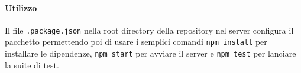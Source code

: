 				\paragraph{Utilizzo}
				Il file \texttt{.package.json} nella root directory della repository nel server configura il pacchetto permettendo poi di usare i semplici comandi \texttt{npm install} per installare le dipendenze, \texttt{npm start} per avviare il server e \texttt{npm test} per lanciare la suite di test.
